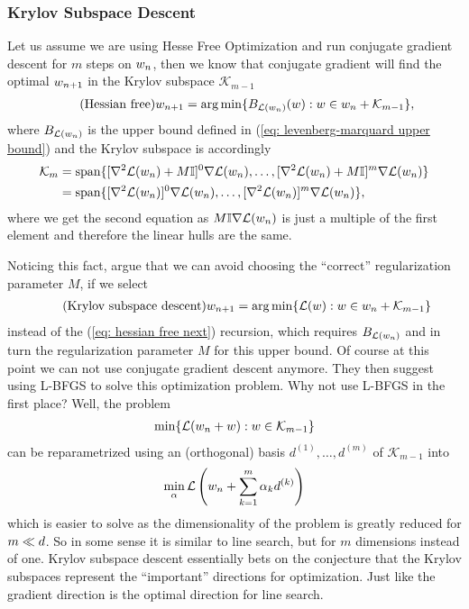 \subsubsection{Krylov Subspace Descent}

Let us assume we are using Hesse Free Optimization and run conjugate gradient
descent for \(m\) steps on \(w_n\), then we know that conjugate gradient
will find the optimal \(w_{n+1}\) in the Krylov subspace \(\mathcal{K}_{m-1}\)
\begin{align}\label{eq: hessian free next}
	\tag{Hessian free}
	w_{n+1} = \arg\min \{ B_{\mathcal{L}(w_n)}(w) : w \in w_n + \mathcal{K}_{m-1} \},
\end{align}
where \(B_{\mathcal{L}(w_n)}\) is the upper bound defined in (\ref{eq:
levenberg-marquard upper bound}) and the Krylov subspace is accordingly
\begin{align*}
	\mathcal{K}_m
	&= \text{span}\{
		[\nabla^2\mathcal{L}(w_n) + M\mathbb{I}]^0 \nabla\mathcal{L}(w_n), \dots,
		[\nabla^2\mathcal{L}(w_n) + M\mathbb{I}]^m \nabla\mathcal{L}(w_n)
	\}	\\
	&= \text{span}\{
		[\nabla^2\mathcal{L}(w_n)]^0 \nabla\mathcal{L}(w_n), \dots,
		[\nabla^2\mathcal{L}(w_n)]^m \nabla\mathcal{L}(w_n)
	\},
\end{align*}
where we get the second equation as \(M\mathbb{I} \nabla\mathcal{L}(w_n)\) is
just a multiple of the first element and therefore the linear hulls are the
same.

Noticing this fact, \textcite{vinyalsKrylovSubspaceDescent2012} argue that we
can avoid choosing the ``correct'' regularization parameter \(M\), if we
select
\begin{align}\label{eq: krylov subspace descent}
	\tag{Krylov subspace descent}
	w_{n+1}
	= \arg\min \{ \mathcal{L}(w) : w \in w_n + \mathcal{K}_{m-1} \}
\end{align}
instead of the (\ref{eq: hessian free next}) recursion, which requires \(B_{\mathcal{L}(w_n)}\)
and in turn the regularization parameter \(M\) for this upper bound. Of course
at this point we can not use conjugate gradient descent anymore. They then suggest
using L-BFGS to solve this optimization problem. Why not use L-BFGS in the first
place? Well, the problem
\begin{align*}
	\min \{ \mathcal{L}(w_n + w) : w \in \mathcal{K}_{m-1} \}
\end{align*}
can be reparametrized using an (orthogonal) basis \(d^{(1)}, \dots, d^{(m)}\)
of \(\mathcal{K}_{m-1}\) into
\begin{align*}
	\min_{\alpha} \mathcal{L}\left(w_n + \sum_{k=1}^m \alpha_k d^{(k)} \right)
\end{align*}
which is easier to solve as the dimensionality of the problem is greatly
reduced for \(m\ll d\). So in some sense it is similar to
line search, but for \(m\) dimensions instead of one. Krylov subspace descent
essentially bets on the conjecture that the Krylov subspaces represent the
 ``important'' directions for optimization. Just
like the gradient direction is the optimal direction for line search.

